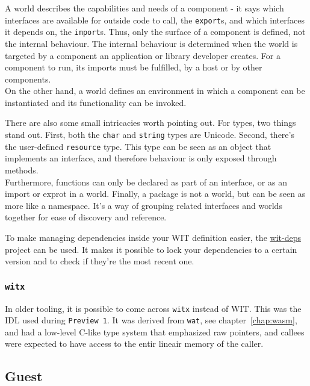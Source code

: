 A world describes the capabilities and needs of a component - it says which interfaces are available for outside code to call, the \texttt{export}s, and which interfaces it depends on, the \texttt{import}s. Thus, only the surface of a component is defined, not the internal behaviour. The internal behaviour is determined when the world is targeted by a component an application or library developer creates. For a component to run, its imports must be fulfilled, by a host or by other components. \\
On the other hand, a world defines an environment in which a component can be instantiated and its functionality can be invoked.

There are also some small intricacies worth pointing out. For types, two things stand out. First, both the \texttt{char} and \texttt{string} types are Unicode. Second, there's the user-defined \texttt{resource} type. This type can be seen as an object that implements an interface, and therefore behaviour is only exposed through methods. \\
Furthermore, functions can only be declared as part of an interface, or as an import or exprot in a world. Finally, a package is not a world, but can be seen as more like a namespace. It's a way of grouping related interfaces and worlds together for ease of discovery and reference.


To make managing dependencies inside your \gls{WIT} definition easier, the \href{https://github.com/bytecodealliance/wit-deps}{wit-deps} project can be used. It makes it possible to lock your dependencies to a certain version and to check if they're the most recent one.

\subsubsection{\texttt{witx}}

In older tooling, it is possible to come across \texttt{witx} instead of \gls{WIT}. This was the \gls{IDL} used during \texttt{Preview 1}. It was derived from \texttt{wat}, see chapter~\ref{chap:wasm}, and had a low-level C-like type system that emphasized raw pointers, and callees were expected to have access to the entir lineair memory of the caller.
 
\subsection{Guest}
\label{sec:guest}

